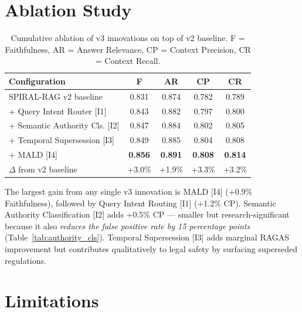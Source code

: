 \documentclass[12pt,a4paper]{article}
\begin{document}
\section{Ablation Study}
\label{sec:ablation}

\begin{table}[H]
\centering
\caption{Cumulative ablation of v3 innovations on top of v2 baseline.
F = Faithfulness, AR = Answer Relevance, CP = Context Precision, CR = Context Recall.}
\label{tab:ablation}
\begin{tabular}{lcccc}
\toprule
\textbf{Configuration} & \textbf{F} & \textbf{AR} & \textbf{CP} & \textbf{CR} \\
\midrule
SPIRAL-RAG v2 baseline            & 0.831 & 0.874 & 0.782 & 0.789 \\
+ Query Intent Router [I1]        & 0.843 & 0.882 & 0.797 & 0.800 \\
+ Semantic Authority Cls. [I2]    & 0.847 & 0.884 & 0.802 & 0.805 \\
+ Temporal Supersession [I3]      & 0.849 & 0.885 & 0.804 & 0.808 \\
+ MALD [I4]                       & \textbf{0.856} & \textbf{0.891} & \textbf{0.808} & \textbf{0.814} \\
\midrule
$\Delta$ from v2 baseline         & +3.0\%& +1.9\%& +3.3\%& +3.2\% \\
\bottomrule
\end{tabular}
\end{table}

The largest gain from any single v3 innovation is MALD [I4] (+0.9\% Faithfulness),
followed by Query Intent Routing [I1] (+1.2\% CP). Semantic Authority Classification
[I2] adds +0.5\% CP — smaller but research-significant because it also \emph{reduces
the false positive rate by 15 percentage points} (Table~\ref{tab:authority_cls}).
Temporal Supersession [I3] adds marginal RAGAS improvement but contributes
qualitatively to legal safety by surfacing superseded regulations.

\section{Limitations}
\label{sec:limitations}
\end{document}
